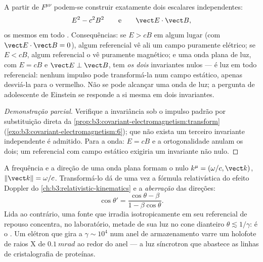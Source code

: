 \begin{proposition}\label{prop:b3:covariant-electromagnetism:invariants}
A partir de $F^{\mu\nu}$ podem-se construir exatamente dois escalares
independentes:
\[
E^2 - c^2B^2
\qquad\text{e}\qquad
\vect E\cdot\vect B ,
\]
os mesmos em todo . Consequências: se $E > cB$ em
algum lugar (com $\vect E\cdot\vect B = 0$), algum referencial vê ali
um campo puramente elétrico; se $E < cB$, algum referencial o vê
puramente magnético; e uma onda plana de luz, com $E = cB$ e
$\vect E\perp\vect B$, tem \emph{os dois} invariantes nulos --- é luz
em todo referencial: nenhum impulso pode transformá-la num campo
estático, apenas desviá-la para o vermelho. Não se pode alcançar uma
onda de luz; a pergunta de adolescente de Einstein se responde a si
mesma em dois invariantes.
\end{proposition}

\begin{proof}[Demonstração parcial]
Verifique a invariância sob o impulso padrão por substituição direta da
\cref{prop:b3:covariant-electromagnetism:transform}
(\cref{exo:b3:covariant-electromagnetism:6}); que não exista um
terceiro invariante independente é admitido. Para a onda: $E = cB$ e a
ortogonalidade anulam os dois; um referencial com campo estático
exigiria um invariante não nulo.
\end{proof}

\begin{proposition}\label{prop:b3:covariant-electromagnetism:wavevector}
A frequência e a direção de uma onda plana formam o  nulo
$k^\mu = (\omega/c, \vect k)$, $\|\vect k\| = \omega/c$. Transformá-lo
dá de uma vez a fórmula relativística do efeito Doppler do
\cref{ch:b3:relativistic-kinematics} e a \emph{aberração} das
direções:
\[
\cos\theta' = \frac{\cos\theta - \beta}{1 - \beta\cos\theta} .
\]
Lida ao contrário, uma fonte que irradia isotropicamente em seu
referencial de repouso concentra, no laboratório, metade de sua luz no
cone dianteiro $\theta
\lesssim 1/\gamma$: é o \emph{}. Um elétron que gira a
$\gamma \sim 10^4$ num anel de armazenamento varre um holofote de
raios X de $\qty{0.1}{mrad}$ ao redor do anel --- a luz síncrotron que
abastece as linhas de cristalografia de proteínas.
\end{proposition}

